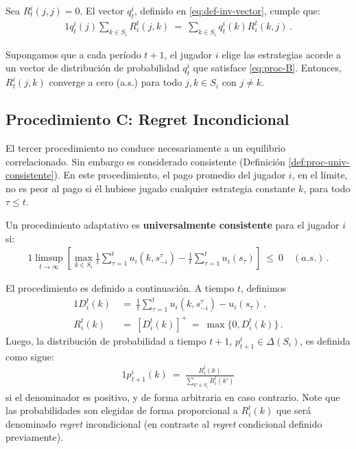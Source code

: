 \begin{theorem}
\label{theo:def-proc-B}
Sea $R_t^i(j, j) = 0$. El vector $q_t^i$, definido en \ref{eq:def-inv-vector}, cumple que:
\begin{alignat}{1}
\label{eq:proc-B}
q^i_t(j)\sum_{k \in S_i} R^t_i(j,k)\ =\ \sum_{k \in S_i} q_t^i(k)R_i^t(k,j) \,.
\end{alignat}
\end{theorem}

\begin{theorem}
\label{theo:conv-proc-B}
Supongamos que a cada período $t+1$, el jugador $i$ elige las estrategias acorde a un vector de distribución de probabilidad $q_t^i$ que satisface \eqref{eq:proc-B}. Entonces, $R^i_t(j, k)$ converge a cero (a.s.) para todo $j, k \in S_i$ con $j \neq k$.
\end{theorem}

\subsection*{Procedimiento C: Regret Incondicional}

El tercer procedimiento no conduce necesariamente a un equilibrio correlacionado. Sin embargo es considerado  consistente (Definición \ref{def:proc-univ-consistente}). En este procedimiento, el pago promedio del jugador $i$, en el límite, no es peor al pago si él hubiese jugado cualquier estrategia constante $k$, para todo $\tau \leq t$.

\begin{definition}
\label{def:proc-univ-consistente}
Un procedimiento adaptativo es \textbf{universalmente consistente} para el jugador $i$ si:
\begin{alignat}{1}
	\limsup_{t \rightarrow \infty } \left[ \max_{k \in S_i} \frac{1}{t} \sum_{\tau = 1}^{t} u_i(k, s_{-i}^{\tau}) - \frac{1}{t} \sum_{\tau = 1}^{t} u_i(s_{\tau}) \right]\ \leq\ 0\quad (a. s.) \,.
\end{alignat}
\end{definition}
El procedimiento es definido a continuación. A tiempo $t$, definimos
\begin{alignat}{1}
D_i^t(k)\ &=\ \frac{1}{t} \sum_{\tau = 1}^{t} u_i(k, s_{-i}^{\tau}) - u_i(s_{\tau}) \,, \\
\label{eq:diferencia-pago-ri}
R_i^t(k)\ &=\ [D_i^t(k)]^+\ =\ \max\{0, D_i^t(k)\} \,.
\end{alignat}
Luego, la distribución de probabilidad a tiempo $t+1$, $p_{t+1}^i \in \Delta(S_i)$, es definida como sigue:
\begin{alignat}{1}
\label{eq:proc-C}
  p_{t+1}^i(k)\ =\ \frac{R_i^t(k)}{\sum_{k'\in S_i} R_i^t(k')}
\end{alignat}
si el denominador es positivo, y de forma arbitraria en caso contrario. Note que las probabilidades son elegidas de forma proporcional a $R_i^t(k)$ que será denominado \textit{regret} incondicional (en contraste al \textit{regret} condicional definido previamente).


